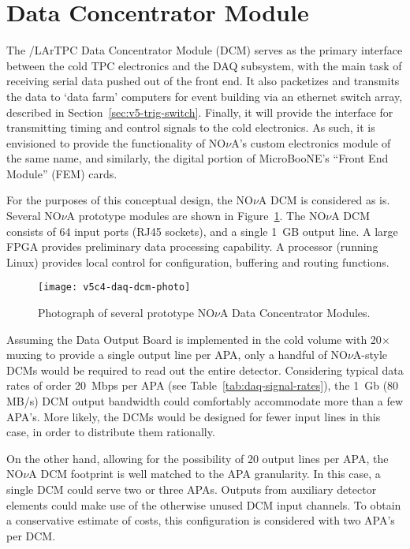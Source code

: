 \section{Data Concentrator Module}
\label{sec:v5-trig-datatransfer}

The \LBNE/LArTPC Data Concentrator Module (DCM) serves as the primary interface 
between the cold TPC electronics and the DAQ subsystem, with the main task 
of receiving serial data pushed out of the front end.  It also packetizes and 
transmits the data to `data farm' computers for event 
building via an ethernet switch array, described in 
Section~\ref{sec:v5-trig-switch}.  Finally, it will provide the interface 
for transmitting timing and control signals to the cold electronics. 
As such, it is envisioned to provide the functionality of NO$\nu$A's custom 
electronics module of the same name, and similarly, the digital portion 
of MicroBooNE's ``Front End Module'' (FEM) cards.  

For the purposes of this conceptual design, the NO$\nu$A DCM 
is considered as is.  Several NO$\nu$A prototype modules are shown in 
Figure~\ref{fig:daq-dcm-photo}.  The NO$\nu$A DCM consists of 64 input 
ports (RJ45 sockets), and a single 1~GB output line.  A large 
FPGA provides preliminary data processing capability.  A processor (running 
Linux) provides local control for configuration, buffering and routing 
functions.
%
\begin{figure}[htbp]
\centering
\texttt{[image: v5c4-daq-dcm-photo]}
\caption{Photograph of several prototype NO$\nu$A Data Concentrator Modules.}
\label{fig:daq-dcm-photo}
\end{figure}

Assuming the Data Output Board is implemented in the cold volume with 
20$\times$ muxing to provide a single output line per APA, only a handful 
of NO$\nu$A-style DCMs would be required to read out the entire detector.  
Considering typical data rates of order 20~Mbps per APA 
(see Table~\ref{tab:daq-signal-rates}), the 1~Gb (80 MB/s) 
DCM output bandwidth 
could comfortably accommodate more than a few APA's.
More likely, the \LBNE DCMs would be designed for fewer input lines 
in this case, in order to distribute them rationally. 

On the other hand, allowing for the possibility of 20 output lines per APA, 
the NO$\nu$A DCM footprint is well matched to the \LBNE APA granularity.  In 
this case, a single DCM could serve two or three APAs.  Outputs from auxiliary 
detector elements could make use of the otherwise unused DCM input channels.
To obtain a conservative estimate of costs, this configuration is considered 
with two APA's per DCM.


